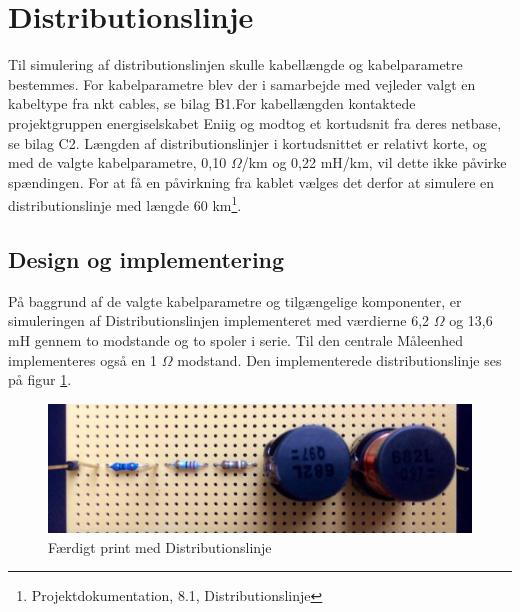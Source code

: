 
\section{Distributionslinje}

Til simulering af distributionslinjen skulle kabellængde og kabelparametre bestemmes. For kabelparametre blev der i samarbejde med vejleder valgt en kabeltype fra nkt cables, se bilag B1.For kabellængden kontaktede projektgruppen energiselskabet Eniig og modtog et kortudsnit fra deres netbase, se bilag C2. Længden af distributionslinjer i kortudsnittet er relativt korte, og med de valgte kabelparametre, 0,10 $\Omega$/km og 0,22 mH/km, vil dette ikke påvirke spændingen. For at få en påvirkning fra kablet vælges det derfor at simulere en distributionslinje med længde 60 km\footnote{Projektdokumentation, 8.1, Distributionslinje}.  

\subsection{Design og implementering}

På baggrund af de valgte kabelparametre og tilgængelige komponenter, er simuleringen af Distributionslinjen implementeret med værdierne 6,2 $\Omega$ og 13,6 mH gennem to modstande og to spoler i serie. Til den centrale Måleenhed implementeres også en 1 $\Omega$ modstand. Den implementerede distributionslinje ses på figur \ref{fig:DisbLinje}.

\begin{figure}[H]
	\centering
	\includegraphics[width=1\textwidth]{figure/Distributionslinje}
	\caption{Færdigt print med Distributionslinje}
	\label{fig:DisbLinje}
\end{figure}

